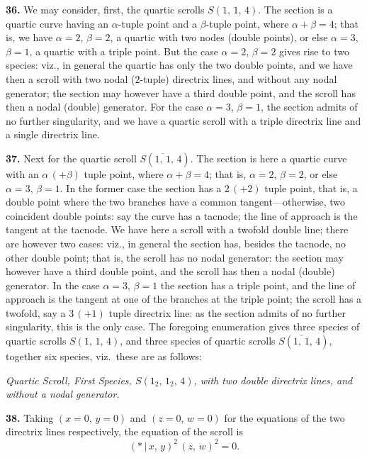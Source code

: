 \documentclass[11pt,a4paper]{article}
\providecommand{\mid}{\,|\,}
\begin{document}
\textbf{36.} We may consider, first, the quartic scrolls $S(1,\,1,\,4)$. The section is a quartic curve having an $\alpha$-tuple point and a $\beta$-tuple point, where $\alpha + \beta = 4$; that is, we have $\alpha = 2$, $\beta = 2$, a quartic with two nodes (double points), or else $\alpha = 3$, $\beta = 1$, a quartic with a triple point. But the case $\alpha = 2$, $\beta = 2$ gives rise to two species: viz., in general the quartic has only the two double points, and we have then a scroll with two nodal ($2$-tuple) directrix lines, and without any nodal generator; the section may however have a third double point, and the scroll has then a nodal (double) generator. For the case $\alpha = 3$, $\beta = 1$, the section admits of no further singularity, and we have a quartic scroll with a triple directrix line and a single directrix line.

\medskip

\textbf{37.} Next for the quartic scroll $S(\overline{1,\,1},\,4)$. The section is here a quartic curve with an $\alpha\,(+\beta)$ tuple point, where $\alpha + \beta = 4$; that is, $\alpha = 2$, $\beta = 2$, or else $\alpha = 3$, $\beta = 1$. In the former case the section has a $2\,(+2)$ tuple point, that is, a double point where the two branches have a common tangent---otherwise, two coincident double points: say the curve has a tacnode; the line of approach is the tangent at the tacnode. We have here a scroll with a twofold double line; there are however two cases: viz., in general the section has, besides the tacnode, no other double point; that is, the scroll has no nodal generator: the section may however have a third double point, and the scroll has then a nodal (double) generator. In the case $\alpha = 3$, $\beta = 1$ the section has a triple point, and the line of approach is the tangent at one of the branches at the triple point; the scroll has a twofold, say a $3\,(+1)$ tuple directrix line: as the section admits of no further singularity, this is the only case. The foregoing enumeration gives three species of quartic scrolls $S(1,\,1,\,4)$, and three species of quartic scrolls $S(\overline{1,\,1},\,4)$, together six species, viz.\ these are as follows:

\bigskip

\begin{center}
\textit{Quartic Scroll, First Species, $S(1_{2},\,1_{2},\,4)$, with two double directrix lines, and without a nodal generator.}
\end{center}

\textbf{38.} Taking $(x = 0,\,y = 0)$ and $(z = 0,\,w = 0)$ for the equations of the two directrix lines respectively, the equation of the scroll is
\[
(*\mid x,\,y)^{2}\,(z,\,w)^{2} = 0.
\]
\end{document}
